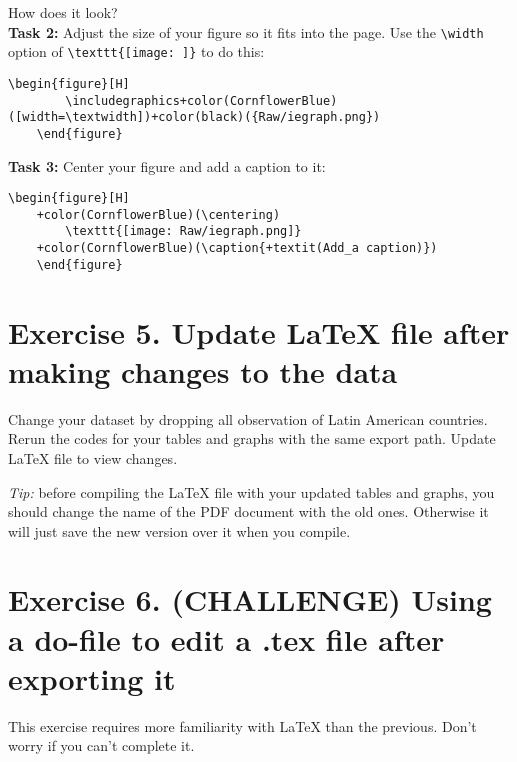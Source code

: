 \documentclass[12pts]{report}
\begin{document}
How does it look? \\

\textbf{Task 2:} Adjust the size of your figure so it fits into the page. Use the \verb|\width| option of \verb|\texttt{[image: ]}| to do this:
\begin{center}
	\begin{Verbatim}[commandchars=+\(\)]
	\begin{figure}[H]
		\includegraphics+color(CornflowerBlue)([width=\textwidth])+color(black)({Raw/iegraph.png})
	\end{figure}
	\end{Verbatim}
\end{center}

\textbf{Task 3:} Center your figure and add a caption to it:
\begin{center}
	\begin{Verbatim}[commandchars=+\(\)]
	\begin{figure}[H]
	+color(CornflowerBlue)(\centering)
		\texttt{[image: Raw/iegraph.png]}
	+color(CornflowerBlue)(\caption{+textit(Add_a caption)})
	\end{figure}
	\end{Verbatim}
\end{center}

\section*{Exercise 5. Update {\LaTeX} file after making changes to the data}
Change your dataset by dropping all observation of Latin American countries. Rerun the codes for your tables and graphs with the same export path. Update {\LaTeX} file to view changes.

\begin{center}
	\textcolor{BurntOrange}{\emph{Tip:} before compiling the {\LaTeX} file with your updated tables and graphs, you should change the name of the PDF document with the old ones. Otherwise it will just save the new version over it when you compile.}
\end{center}

\section*{Exercise 6. (CHALLENGE) Using a do-file to edit a .tex file after exporting it}

This exercise requires more familiarity with {\LaTeX} than the previous. Don't worry if you can't complete it. \\
\end{document}
